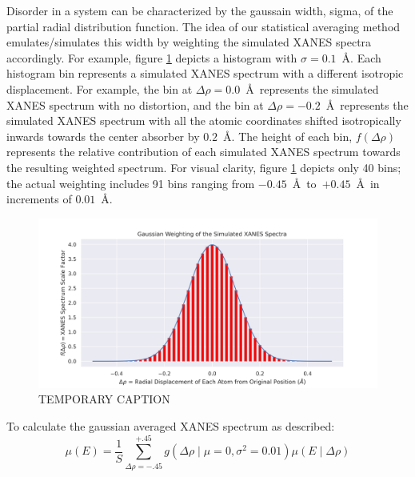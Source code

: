 Disorder in a system can be characterized by the gaussain width, sigma, of the partial radial distribution function. The idea of our statistical averaging method emulates/simulates this width by weighting the simulated XANES spectra accordingly. For example, figure \ref{fig:gaussian-weighting-hist} depicts a histogram with $ \sigma=0.1 $~\AA. Each histogram bin represents a simulated XANES spectrum with a different isotropic displacement. For example, the bin at $ \Delta\rho=0.0 $~\AA~represents the simulated XANES spectrum with no distortion, and the bin at $ \Delta\rho=-0.2 $~\AA~represents the simulated XANES spectrum with all the atomic coordinates shifted isotropically inwards towards the center absorber by $ 0.2 $~\AA. The height of each bin, $ f(\Delta\rho) $ represents the relative contribution of each simulated XANES spectrum towards the resulting weighted spectrum. For visual clarity, figure \ref{fig:gaussian-weighting-hist} depicts only 40 bins; the actual weighting includes 91 bins ranging from $ -0.45 $~\AA~to~$ +0.45 $~\AA~in increments of $ 0.01 $~\AA. 

\begin{figure}[!htb]
	\centering
	\includegraphics[width=\linewidth]{Chapters/Figures/gaussian-weighting-hist.png}
	\caption[Simulated Spectrum Gaussian Weighting]{TEMPORARY CAPTION}
	\label{fig:gaussian-weighting-hist}
\end{figure}

To calculate the gaussian averaged XANES spectrum as described:
\begin{equation}
	\label{eqn:gaussian-averaging}
	\mu(E) = \frac{1}{S} \sum_{\Delta\rho=-.45}^{+.45} g\left(\Delta \rho \mid \mu=0, \sigma^2=0.01\right) \mu(E \mid \Delta\rho)
\end{equation}

